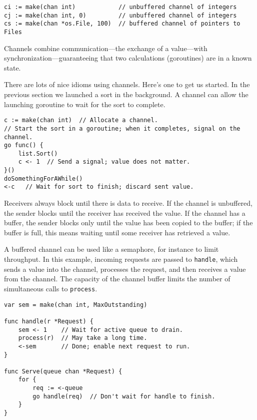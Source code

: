 \begin{Verbatim}[frame=single]
ci := make(chan int)            // unbuffered channel of integers
cj := make(chan int, 0)         // unbuffered channel of integers
cs := make(chan *os.File, 100)  // buffered channel of pointers to Files
\end{Verbatim}

Channels combine communication---the exchange of a value---with
synchronization---guaranteeing that two calculations (goroutines) are in
a known state.

There are lots of nice idioms using channels. Here's one to get us
started. In the previous section we launched a sort in the background. A
channel can allow the launching goroutine to wait for the sort to
complete.

\begin{Verbatim}[frame=single]
c := make(chan int)  // Allocate a channel.
// Start the sort in a goroutine; when it completes, signal on the channel.
go func() {
    list.Sort()
    c <- 1  // Send a signal; value does not matter.
}()
doSomethingForAWhile()
<-c   // Wait for sort to finish; discard sent value.
\end{Verbatim}

Receivers always block until there is data to receive. If the channel is
unbuffered, the sender blocks until the receiver has received the value.
If the channel has a buffer, the sender blocks only until the value has
been copied to the buffer; if the buffer is full, this means waiting
until some receiver has retrieved a value.

A buffered channel can be used like a semaphore, for instance to limit
throughput. In this example, incoming requests are passed to
\texttt{handle}, which sends a value into the channel, processes the
request, and then receives a value from the channel. The capacity of the
channel buffer limits the number of simultaneous calls to
\texttt{process}.

\begin{Verbatim}[frame=single]
var sem = make(chan int, MaxOutstanding)

func handle(r *Request) {
    sem <- 1    // Wait for active queue to drain.
    process(r)  // May take a long time.
    <-sem       // Done; enable next request to run.
}

func Serve(queue chan *Request) {
    for {
        req := <-queue
        go handle(req)  // Don't wait for handle to finish.
    }
}
\end{Verbatim}

